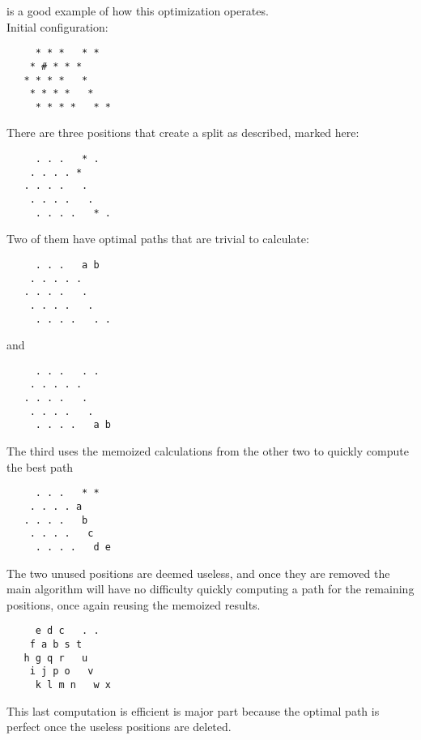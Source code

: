  is a good example of how this optimization operates.\\
Initial configuration:
\begin{lstlisting}
     * * *   * *       
    * # * * *         
   * * * *   *         
    * * * *   *       
     * * * *   * *     
\end{lstlisting}

There are three positions that create a split as described, marked here:
\begin{lstlisting}
     . . .   * .       
    . . . . *         
   . . . .   .         
    . . . .   .       
     . . . .   * .
\end{lstlisting}

Two of them have optimal paths that are trivial to calculate:
\begin{lstlisting}
     . . .   a b       
    . . . . .         
   . . . .   .         
    . . . .   .       
     . . . .   . .
\end{lstlisting}
and
\begin{lstlisting}
     . . .   . .       
    . . . . .         
   . . . .   .         
    . . . .   .       
     . . . .   a b
\end{lstlisting}

The third uses the memoized calculations from the other two to quickly compute
the best path
\begin{lstlisting}
     . . .   * *       
    . . . . a         
   . . . .   b         
    . . . .   c       
     . . . .   d e
\end{lstlisting}

The two unused positions are deemed useless, and once they are removed
the main algorithm will have no difficulty quickly computing a path
for the remaining positions, once again reusing the memoized results.
\begin{lstlisting}
     e d c   . .
    f a b s t
   h g q r   u
    i j p o   v
     k l m n   w x
\end{lstlisting}
This last computation is efficient is major part because the optimal path
is perfect once the useless positions are deleted.


